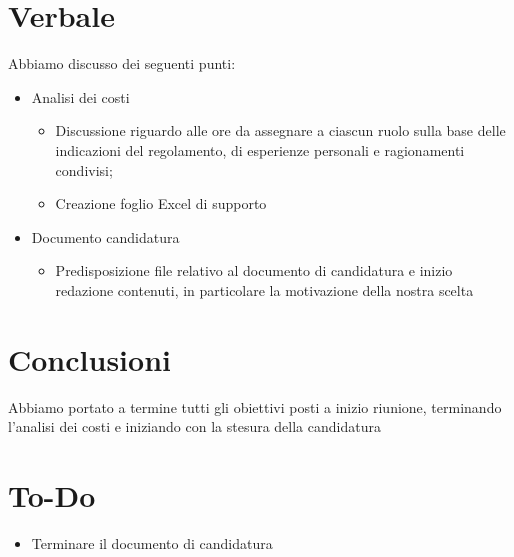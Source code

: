 \documentclass[a4paper,10pt]{article}
\begin{document}
\newpage

\section*{Verbale}
Abbiamo discusso dei seguenti punti:
\begin{itemize}
    \item Analisi dei costi
    \begin{itemize}
        \item Discussione riguardo alle ore da assegnare a ciascun ruolo sulla base delle indicazioni del regolamento, di esperienze personali e ragionamenti condivisi;
        \item Creazione foglio Excel di supporto 
    \end{itemize}
    \item Documento candidatura
    \begin{itemize}
        \item 	Predisposizione file relativo al documento di candidatura e  inizio redazione contenuti, in particolare la motivazione della nostra scelta
    \end{itemize}
\end{itemize}

\section*{Conclusioni}
Abbiamo portato a termine tutti gli obiettivi posti a inizio riunione, terminando l'analisi dei costi e iniziando con la stesura della candidatura

\section*{To-Do}
\begin{itemize}
    \par
    \item Terminare il documento di candidatura
\end{itemize}
\end{document}
